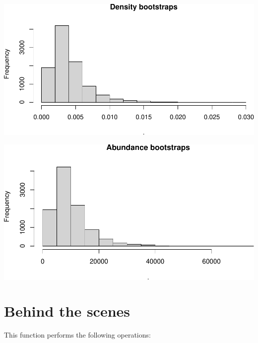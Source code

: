 \documentclass[
]{book}
\begin{document}
\includegraphics{figures/unnamed-chunk-246-1.pdf}

\includegraphics{figures/unnamed-chunk-247-1.pdf}

\hypertarget{behind-the-scenes-2}{%
\section*{Behind the scenes}\label{behind-the-scenes-2}}

This function performs the following operations:
\end{document}
